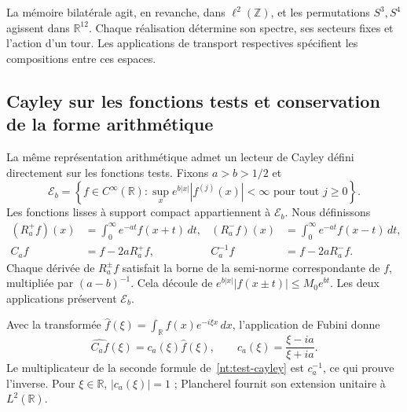 La mémoire bilatérale agit, en revanche, dans
\(\ell^2(\mathbb Z)\), et les permutations \(S^3,S^4\)
agissent dans \(\mathbb R^{12}\). Chaque réalisation détermine
son spectre, ses secteurs fixes et l’action d’un tour.
Les applications de transport respectives spécifient les
compositions entre ces espaces.

\subsection{Cayley sur les fonctions tests et conservation de la forme arithmétique}

La même représentation arithmétique admet un lecteur de Cayley défini directement sur les fonctions tests. Fixons \(a>b>1/2\) et
\[
 \mathscr E_b=
 \left\{f\in C^\infty(\mathbb R):
   \sup_x e^{b|x|}|f^{(j)}(x)|<\infty
   \text{ pour tout }j\geq0\right\}.
\]
Les fonctions lisses à support compact appartiennent à \(\mathscr E_b\). Nous définissons
\begin{align}
 (R_a^+f)(x)&=\int_0^\infty e^{-at}f(x+t)\,dt,
 &(R_a^-f)(x)&=\int_0^\infty e^{-at}f(x-t)\,dt,\label{nt:resolvents}\\
 C_af&=f-2aR_a^+f,
 &C_a^{-1}f&=f-2aR_a^-f.\label{nt:test-cayley}
\end{align}
Chaque dérivée de \(R_a^\pm f\) satisfait la borne de la semi-norme correspondante de \(f\), multipliée par \((a-b)^{-1}\). Cela découle de \(e^{b|x|}|f(x\pm t)|\leq M_0e^{bt}\). Les deux applications préservent \(\mathscr E_b\).

Avec la transformée
\(\widehat f(\xi)=\int_{\mathbb R}f(x)e^{-i\xi x}\,dx\),
l’application de Fubini donne
\begin{equation}
 \widehat{C_af}(\xi)
 =c_a(\xi)\widehat f(\xi),\qquad
 c_a(\xi)=\frac{\xi-ia}{\xi+ia}.
 \label{nt:cayley-multiplier}
\end{equation}
Le multiplicateur de la seconde formule
de~\eqref{nt:test-cayley} est \(c_a^{-1}\), ce qui prouve
l’inverse. Pour \(\xi\in\mathbb R\),
\(|c_a(\xi)|=1\) ; Plancherel fournit son extension
unitaire à \(L^2(\mathbb R)\).


